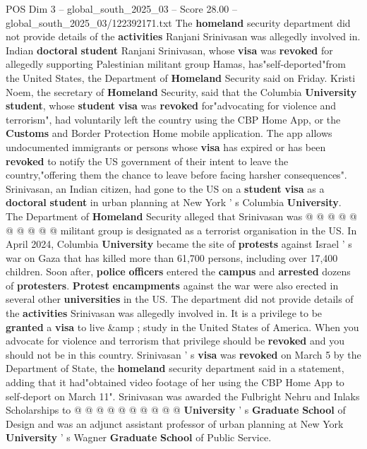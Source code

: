 \begin{textsample}{POS Dim 3 – global\_south\_2025\_03 – Score 28.00 – global\_south\_2025\_03/122392171.txt}  \label{ex:f3_pos_039}
The \textbf{homeland} security department did not provide details of the \textbf{activities} Ranjani Srinivasan was allegedly involved in.
Indian \textbf{doctoral} \textbf{student} Ranjani Srinivasan, whose \textbf{visa} was \textbf{revoked} for allegedly supporting Palestinian militant group Hamas, has"self-deported"from the United States, the Department of \textbf{Homeland} Security said on Friday.
Kristi Noem, the secretary of \textbf{Homeland} Security, said that the Columbia \textbf{University} \textbf{student}, whose \textbf{student} \textbf{visa} was \textbf{revoked} for"advocating for violence and terrorism", had voluntarily left the country using the CBP Home App, or the \textbf{Customs} and Border Protection Home mobile application.
The app allows undocumented immigrants or persons whose \textbf{visa} has expired or has been \textbf{revoked} to notify the US government of their intent to leave the country,"offering them the chance to leave before facing harsher consequences".
Srinivasan, an Indian citizen, had gone to the US on a \textbf{student} \textbf{visa} as a \textbf{doctoral} \textbf{student} in urban planning at New York ' s Columbia \textbf{University}.
The Department of \textbf{Homeland} Security alleged that Srinivasan was @ @ @ @ @ @ @ @ @ @ militant group is designated as a terrorist organisation in the US.
In April 2024, Columbia \textbf{University} became the site of \textbf{protests} against Israel ' s war on Gaza that has killed more than 61,700 persons, including over 17,400 children.
Soon after, \textbf{police} \textbf{officers} entered the \textbf{campus} and \textbf{arrested} dozens of \textbf{protesters}. \textbf{Protest} \textbf{encampments} against the war were also erected in several other \textbf{universities} in the US.
The department did not provide details of the \textbf{activities} Srinivasan was allegedly involved in.
It is a privilege to be \textbf{granted} a \textbf{visa} to live \&amp ; study in the United States of America.
When you advocate for violence and terrorism that privilege should be \textbf{revoked} and you should not be in this country.
Srinivasan ' s \textbf{visa} was \textbf{revoked} on March 5 by the Department of State, the \textbf{homeland} security department said in a statement, adding that it had"obtained video footage of her using the CBP Home App to self-deport on March 11".
Srinivasan was awarded the Fulbright Nehru and Inlaks Scholarships to @ @ @ @ @ @ @ @ @ @ \textbf{University} ' s \textbf{Graduate} \textbf{School} of Design and was an adjunct assistant professor of urban planning at New York \textbf{University} ' s Wagner \textbf{Graduate} \textbf{School} of Public Service.

\end{textsample}
